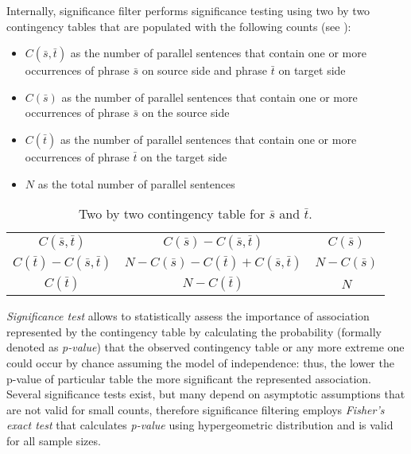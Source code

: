 Internally, significance filter performs significance testing using two by two
contingency tables that are populated with the following counts (see
):
\begin{itemize}
  \item $C(\bar{s},\bar{t})$ as the number of parallel sentences that contain one or more
    occurrences of phrase $\bar{s}$ on source side and phrase $\bar{t}$ on target side
  \item $C(\bar{s})$ as the number of parallel sentences that contain one or more
    occurrences of phrase $\bar{s}$ on the source side
  \item $C(\bar{t})$ as the number of parallel sentences that contain one or more
    occurrences of phrase $\bar{t}$ on the target side
  \item $N$ as the total number of parallel sentences
\end{itemize}

\begin{table}[ht]
\centering
\def\arraystretch{1.5}
\begin{tabular}{ | c c | c | }
\hline
$C(\bar{s},\bar{t})$  &  $C(\bar{s}) - C(\bar{s},\bar{t})$  &  $C(\bar{s})$ \\
$C(\bar{t}) - C(\bar{s},\bar{t})$  &  $N - C(\bar{s}) - C(\bar{t}) + C(\bar{s},\bar{t})$  & $N - C(\bar{s})$ \\
\hline
$C(\bar{t})$  &  $N - C(\bar{t})$  &  $N$ \\
\hline
\end{tabular}
\caption{\label{two-by-two-contingency-table}
Two by two contingency table for $\bar{s}$ and $\bar{t}$.}
\end{table}

\emph{Significance test} allows to statistically assess the importance of association
represented by the contingency table by calculating the probability (formally denoted
as \emph{p-value}) that the observed contingency table or any more extreme one could
occur by chance assuming the model of independence: thus, the lower the p-value of
particular table the more significant the represented association.
Several significance tests exist, but many depend on asymptotic assumptions
that are not valid for small counts, therefore significance filtering employs
\emph{Fisher's exact test} that calculates \emph{p-value} using hypergeometric
distribution and is valid for all sample sizes.

